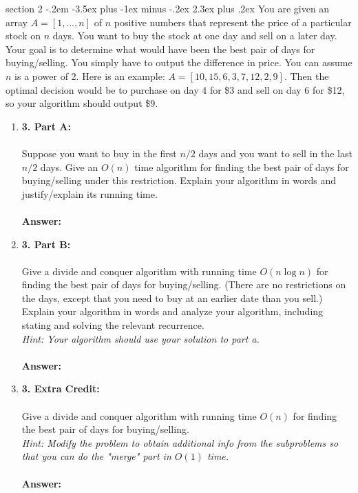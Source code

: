 \documentclass{article}
\makeatletter
\newenvironment{problem}{\@startsection
       {section}
       {2}
       {-.2em}
       {-3.5ex plus -1ex minus -.2ex}
       {2.3ex plus .2ex}
       {\pagebreak[3]%
       \large\bf\noindent{Problem }
       }
       }
\makeatother
\begin{document}
\newpage
\begin{problem} {}
	You are given an array $A= [1, \dots, n]$ of $n$ positive numbers that represent the price of a particular stock on $n$ days. You want to buy the stock at one day and sell on a later day. Your goal is to determine what would have been the best pair of days for buying/selling. You simply have to output the difference in price.  You can assume $n$ is a power of 2.
	Here is an example: $A = [10, 15, 6, 3, 7, 12, 2, 9]$. Then the optimal decision would be to purchase on day 4 for \$3 and sell on day 6 for \$12, so your algorithm should output \$9.  \\
	\begin{enumerate}
		\item [] \textbf{3. Part A:}\\\\
		Suppose you want to buy in the first $n/2$ days and you want to sell in the last $n/2$ days. Give an $O(n)$ time algorithm for finding the best pair of days for buying/selling under this restriction. Explain your algorithm in words and justify/explain its running time.\\\\
		\textbf{Answer:}
		
		
		\newpage
		\item[] \textbf{3. Part B:}\\\\
		Give a divide and conquer algorithm with running time $O(n\log n)$ for finding the best pair of days for buying/selling. (There are no restrictions on the days, except that you need to buy at an earlier date than you sell.) Explain your algorithm in words and analyze your algorithm, including stating and solving the relevant recurrence.\\
		\textit{Hint: Your algorithm should use your solution to part a.}\\\\
		\textbf{Answer:}
		
		\newpage
		\item[] \textbf{3. Extra Credit:}\\\\
		Give a divide and conquer algorithm with running time $O(n)$ for finding the best pair of days for buying/selling.\\
		\textit{Hint: Modify the problem to obtain additional info from the subproblems so that you can do the "merge" part in $O(1)$ time.}\\\\
		\textbf{Answer:}
		
	\end{enumerate}
	
\end{problem}
\end{document}
